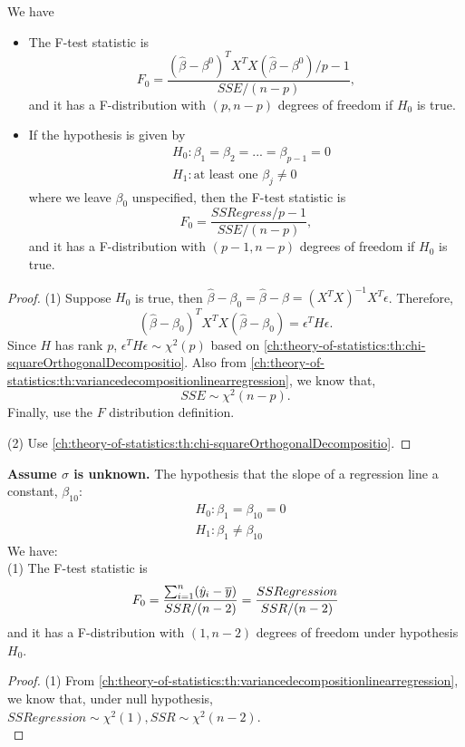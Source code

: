\begin{refsection}
\begin{lemma}
	We have
	\begin{itemize}
		\item The F-test statistic is 
		$$F_0 = \frac{(\hat{\beta} - \beta^0)^TX^TX(\hat{\beta} - \beta^0)/p-1}{SSE/(n-p)},$$
		and it has a F-distribution with $(p,n-p)$ degrees of freedom if $H_0$ is true.
		\item If the hypothesis is given by 
		\begin{align*}
		&H_0: \beta_1 = \beta_2 = ... = \beta_{p-1} = 0\\
		&H_1: \text{at least one }\beta_j \neq 0
		\end{align*}
		where we leave $\beta_0$ unspecified, then
		the F-test statistic is 
		$$F_0 = \frac{SSRegress/p-1}{SSE/(n-p)},$$
		and it has a F-distribution with $(p-1,n-p)$ degrees of freedom if $H_0$ is true.
	\end{itemize}
\end{lemma}
\begin{proof}
	(1) Suppose $H_0$ is true, then $\hat{\beta} - \beta_0 = \hat{\beta} - \beta = (X^TX)^{-1}X^T\epsilon$. 
	Therefore, 
	$$(\hat{\beta} - \beta_0)^TX^TX(\hat{\beta} - \beta_0) = \epsilon^TH\epsilon.$$
	Since $H$ has rank $p$, $\epsilon^TH\epsilon\sim \chi^2(p)$ based on \autoref{ch:theory-of-statistics:th:chi-squareOrthogonalDecompositio}. 
	Also from \autoref{ch:theory-of-statistics:th:variancedecompositionlinearregression}, we know that, $$SSE\sim \chi^2(n-p).$$
	Finally, use the $F$ distribution definition. 
	
	(2)
	Use \autoref{ch:theory-of-statistics:th:chi-squareOrthogonalDecompositio}. 
	
\end{proof}



\begin{lemma}
	\textbf{Assume $\sigma$ is unknown.}	
	The hypothesis that the slope of a regression line a constant, $\beta_{10}$:
	\begin{align*}
	&H_0: \beta_1 = \beta_{10} = 0\\
	&H_1: \beta_1 \neq \beta_{10}
	\end{align*}
	We have:\\
	(1)
	The F-test statistic is
	$$F_0 = \frac{\sum_{i=1}^n (\hat{y}_i - \overline{y})}{SSR/(n-2)} = \frac{SSRegression}{SSR/(n-2)}$$
	and it has a F-distribution with $(1,n-2)$ degrees of freedom under hypothesis $H_0$.
\end{lemma}
\begin{proof}
	(1) From \autoref{ch:theory-of-statistics:th:variancedecompositionlinearregression},  we know that, under null hypothesis,  $SSRegression \sim \chi^2(1), SSR\sim \chi^2(n-2)$. \\


\end{proof}
\end{refsection}
